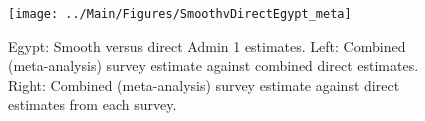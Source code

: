 \documentclass[12pt]{article}\usepackage[]{graphicx}\usepackage[]{color}
\newenvironment{knitrout}{}{} %
\begin{document}

\begin{knitrout}
\color{fgcolor}\begin{figure}[bht]

{\centering \texttt{[image: ../Main/Figures/SmoothvDirectEgypt\_meta]} 

}

\caption[Egypt]{Egypt: Smooth versus direct Admin 1 estimates. Left: Combined (meta-analysis) survey estimate against combined direct estimates. Right: Combined (meta-analysis) survey estimate against direct estimates from each survey.}\label{fig:unnamed-chunk-103}
\end{figure}


\end{knitrout}
\end{document}

